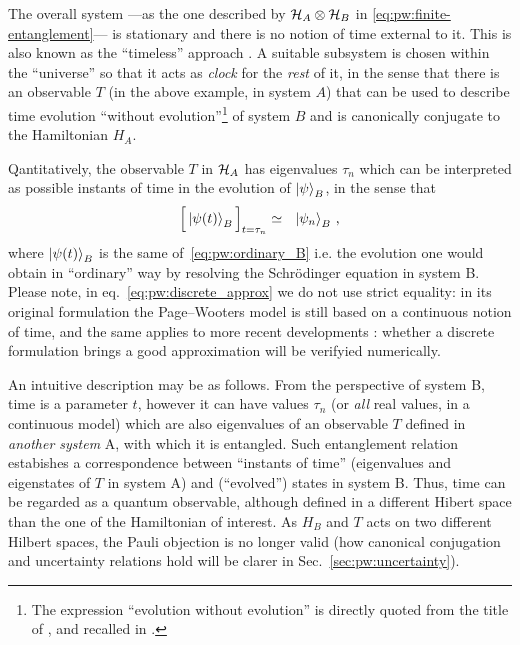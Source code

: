The overall system
---as the one described by $\mathcal{H}_A \otimes \mathcal{H}_B$ in \eqref{eq:pw:finite-entanglement}---
is stationary and there is no notion
of time external to it.
This is also known as the
``timeless'' approach \parencite{Marletto:Evolution}.
\citereset
A suitable subsystem is chosen within the ``universe'' so that it acts as
\emph{clock} for the \emph{rest} of it, in the sense that
there is an observable $T$ (in the above example, in system $A$)
that can be used to
describe time evolution ``without evolution''\footnote{
  The expression ``evolution without evolution''
  is directly quoted from the title of \cite{PageWootters},
  and recalled in \cite{Marletto:Evolution}.
}
of system $B$
and is canonically conjugate to the Hamiltonian $H_A$.


Qantitatively,
the observable $T$ in $\mathcal{H}_A$
has eigenvalues $\tau_n$ which can be interpreted as possible
instants of time in the evolution of $\ket{\psi}_B$, in the sense that
\begin{equation}\label{eq:pw:discrete_approx}
  \Big[ \ket{\psi(t)}_B \Big]_{t=\tau_n} \simeq \,\,\,\, \ket{\psi_n}_B \, \text{,}
\end{equation}
where $\ket{\psi(t)}_B$ is the same of~\eqref{eq:pw:ordinary_B} i.e.
the evolution one would obtain in ``ordinary'' way
by resolving the Schr\"{o}dinger equation in system B.
Please note, in eq.~\eqref{eq:pw:discrete_approx} we do not use strict equality:
in its original formulation the Page--Wooters model is still based on a continuous
notion of time, and the same applies to more recent developments \parencite{Lloyd:Time}:
whether a discrete formulation
brings a good approximation
will be verifyied numerically.

An intuitive description may be as follows.
From the perspective of system B, time is a parameter $t$, however it can have values
$\tau_n$ (or \emph{all} real values, in a continuous model)
which are also eigenvalues of an observable $T$ defined in \emph{another system} A,
with which it is entangled. Such entanglement relation estabishes a correspondence
between ``instants of time'' (eigenvalues and eigenstates of $T$ in system A)
and (``evolved'') states in system B. Thus, time can be regarded as a quantum observable,
although defined in a different Hibert space than the one of the Hamiltonian of interest.
As $H_B$ and $T$ acts on two different Hilbert spaces, the Pauli objection is no longer valid
(how canonical conjugation and uncertainty relations hold will be clarer in Sec.~\ref{sec:pw:uncertainty}).

